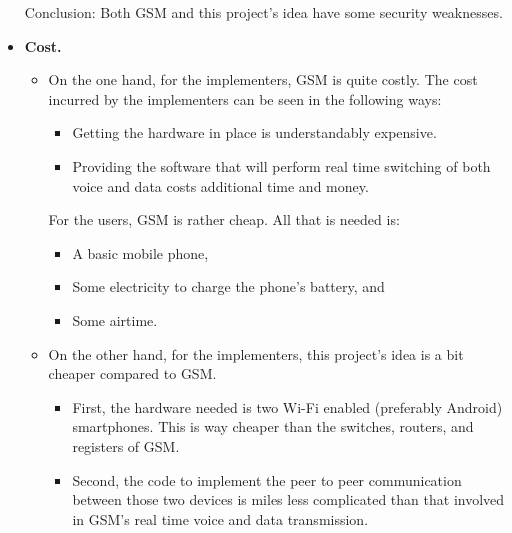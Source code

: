 \documentclass[12pt,svgnames,smaller]{article} %
\begin{document}
\begin{itemize}
\begin{itemize}
		\end{itemize}
		
		Conclusion: Both GSM and this project’s idea have some security weaknesses.
		
		
		\item \textbf{Cost.}
		
		\begin{itemize}
			
			\item On the one hand, for the implementers, GSM is quite costly. The cost incurred by the implementers can be seen in the following ways: 
			
			\begin{itemize}
				\item Getting the hardware in place is understandably expensive. 
				\item Providing the software that will perform real time switching of both voice and data costs additional time and money. 
			\end{itemize}
			
			For the users, GSM is rather cheap. All that is needed is:
			
			\begin{itemize}
				\item A basic mobile phone,
				\item Some electricity to charge the phone’s battery, and 
				\item Some airtime.
			\end{itemize}
			
			\item On the other hand, for the implementers, this project’s idea is a bit cheaper compared to GSM.
			
			\begin{itemize}
				\item First, the hardware needed is two Wi-Fi enabled (preferably Android) smartphones. This is way cheaper than the switches, routers, and registers of GSM.
				\item Second, the code to implement the peer to peer communication between those two devices is miles less complicated than that involved in GSM’s real time voice and data transmission.  
			\end{itemize}
			

\end{itemize}
\end{itemize}
\end{document}
